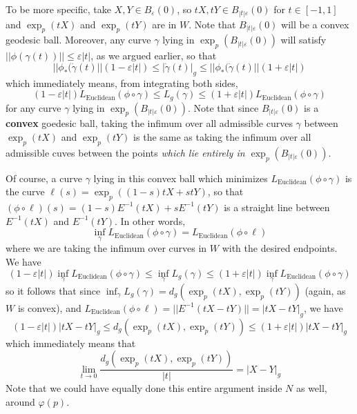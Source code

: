 \documentclass[aps,pra,showpacs,notitlepage,onecolumn,superscriptaddress,nofootinbib]{revtex4-1}
\theoremstyle{definition}
\begin{document}
To be more specific, take $X, Y \in B_{\varepsilon}(0)$, so $tX, tY \in B_{|t| \varepsilon}(0)$ for $t \in [-1, 1]$ and $\exp_p(tX)$ and $\exp_p(tY)$ are in $W$. Note that $B_{|t| \varepsilon}(0)$ will be a convex
geodesic ball. Moreover, any curve $\gamma$ lying in $\exp_p(B_{|t| \varepsilon}(0))$ will satisfy $||\phi(\gamma(t))|| \leq \varepsilon |t|$, as we argued earlier, so that
\begin{equation}
  ||\phi_{*}(\dot{\gamma}(t)|| \left(1 - \varepsilon |t|\right) \leq |\dot{\gamma}(t)|_g \leq ||\phi_{*}(\dot{\gamma}(t)|| \left( 1 + \varepsilon |t| \right)
\end{equation}
which immediately means, from integrating both sides,
\begin{equation}
  \left(1 - \varepsilon |t|\right) L_{\text{Euclidean}}(\phi \circ \gamma) \leq L_g(\gamma) \leq \left( 1 + \varepsilon |t| \right) L_{\text{Euclidean}}(\phi \circ \gamma)
\end{equation}
for any curve $\gamma$ lying in $\exp_p(B_{|t| \varepsilon}(0))$. Note that since $B_{|t| \varepsilon}(0)$ is a \textbf{convex} goedesic ball, taking the infimum over all admissible curves $\gamma$
between $\exp_p(tX)$ and $\exp_p(tY)$ is the same as taking the infimum over all admissible cuves between the points \emph{which lie entirely in $\exp_p(B_{|t| \varepsilon}(0))$}.
\newline

\noindent Of course,
a curve $\gamma$ lying in this convex ball which minimizes $L_{\text{Euclidean}}(\phi \circ \gamma)$ is the curve $\ell(s) = \exp_p((1 - s) t X + s t Y)$, so that $(\phi \circ \ell)(s) = (1 - s) E^{-1}(t X) + s E^{-1}(t Y)$
is a straight line between $E^{-1}(tX)$ and $E^{-1}(tY)$. In other words,
\begin{equation}
  \inf_{\gamma} L_{\text{Euclidean}}(\phi \circ \gamma) = L_{\text{Euclidean}}(\phi \circ \ell)
\end{equation}
where we are taking the infimum over curves in $W$ with the desired endpoints. We have
\begin{equation}
  \left(1 - \varepsilon |t|\right) \inf_{\gamma} L_{\text{Euclidean}}(\phi \circ \gamma) \leq \inf_{\gamma} L_g(\gamma) \leq \left( 1 + \varepsilon |t| \right) \inf_{\gamma} L_{\text{Euclidean}}(\phi \circ \gamma)
\end{equation}
so it follows that since $\inf_{\gamma} L_g(\gamma) = d_g(\exp_p(tX), \exp_p(tY))$ (again, as $W$ is convex), and $L_{\text{Euclidean}}(\phi \circ \ell) = ||E^{-1}(tX - tY)|| = |tX - tY|_g$, we have
  \begin{equation}
    \left(1 - \varepsilon |t| \right) |tX - tY|_g \leq d_g(\exp_p(tX), \exp_p(tY)) \leq \left( 1 + \varepsilon |t| \right) |tX - tY|_g
  \end{equation}
  which immediately means that
  \begin{equation}
    \lim_{t \to 0} \frac{d_g(\exp_p(tX), \exp_p(tY))}{|t|} = |X - Y|_g
  \end{equation}
  Note that we could have equally done this entire argument inside $N$ as well, around $\varphi(p)$.
\end{document}
